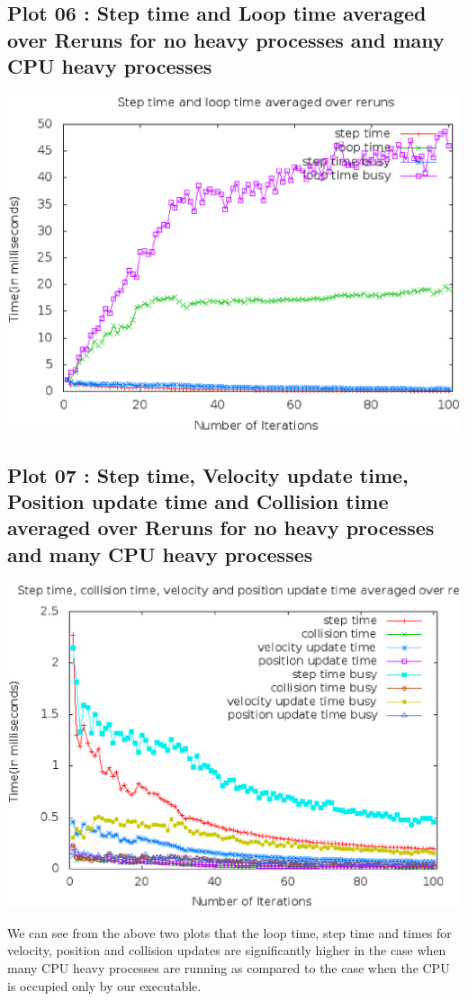 \documentclass[10pt]{article}
\begin{document}
\subsection{Plot 06 : Step time and Loop time averaged over Reruns for no heavy processes and many CPU heavy processes}
\begin{center}
\includegraphics[scale=0.4]{compare1}
\end{center}
\subsection{Plot 07 : Step time, Velocity update time, Position update time and Collision time averaged over Reruns for no heavy processes and many CPU heavy processes}
\begin{center}
\includegraphics[scale=0.4]{compare2}
\end{center}
We can see from the above two plots that the loop time, step time and times for velocity, position and collision updates are significantly higher in the case when many CPU heavy processes are running as compared to the case when the CPU is occupied only by our executable.
\end{document}
